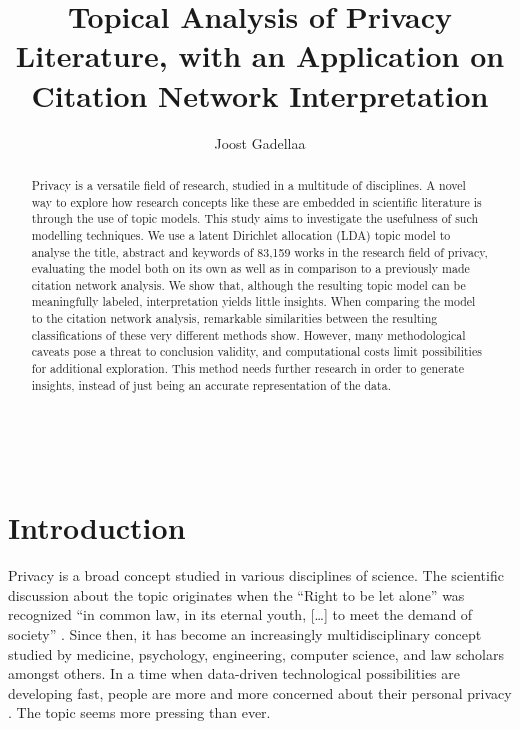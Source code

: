 \documentclass[runningheads]{llncs}
\begin{document}
 

%
\title{Topical Analysis of Privacy Literature, with an Application on Citation Network Interpretation} %
%
%
\author{Joost Gadellaa}
%
%
\\
%
\maketitle              %
%
\begin{abstract}
Privacy is a versatile field of research, studied in a multitude of disciplines. A novel way to explore how research concepts like these are embedded in scientific literature is through the use of topic models. This study aims to investigate the usefulness of such modelling techniques. We use a latent Dirichlet allocation (LDA) topic model to analyse the title, abstract and keywords of 83,159 works in the research field of privacy, evaluating the model both on its own as well as in comparison to a previously made citation network analysis. We show that, although the resulting topic model can be meaningfully labeled, interpretation yields little insights. When comparing the model to the citation network analysis, remarkable similarities between the resulting classifications of these very different methods show. However, many methodological caveats pose a threat to conclusion validity, and computational costs limit possibilities for additional exploration. This method needs further research in order to generate insights, instead of just being an accurate representation of the data. 
\end{abstract}
%
%
%
\section{Introduction}
Privacy is a broad concept studied in various disciplines of science. The scientific discussion about the topic originates when the “Right to be let alone” was recognized “in common law, in its eternal youth, […] to meet the demand of society” \cite{warren_right_1890}. Since then, it has become an increasingly multidisciplinary concept studied by medicine, psychology, engineering, computer science, and law scholars amongst others. In a time when data-driven technological possibilities are developing fast, people are more and more concerned about their personal privacy \cite{kokolakis_privacy_2017}. The topic seems more pressing than ever. 
\end{document}
